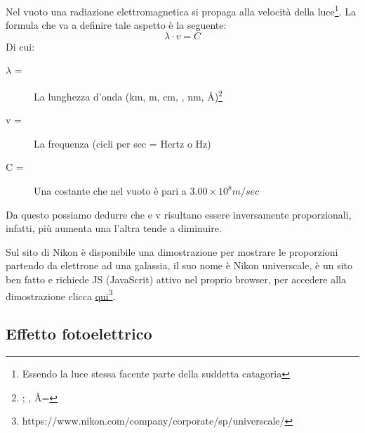 Nel vuoto una radiazione elettromagnetica si propaga alla velocità della luce\footnote{Essendo la luce
  stessa facente parte della suddetta catagoria}. La formula che va a definire tale aspetto è la seguente:
\begin{equation}
  \label{eq:veldiunaradelect}
  \lambda\cdot v=C
\end{equation}
Di cui:
\begin{description}
\item[$\lambda$ =] La lunghezza d'onda (km, m, cm, , nm, Å)\footnote{; , Å=}
\item[v =] La frequenza (cicli per sec = Hertz o Hz)
\item[C =] Una costante che nel vuoto è pari a $3.00\times 10^8 m/sec$
\end{description}
\clearpage
\begin{oss}
  Da questo possiamo dedurre che \ce{\lambda} e v risultano essere inversamente proporzionali, infatti,
  più aumenta una l'altra tende a diminuire.
\end{oss}
\begin{nota}
  Sul sito di Nikon è disponibile una dimostrazione per mostrare le proporzioni partendo da elettrone
  ad una galassia, il suo nome è Nikon universcale, è un sito ben fatto e richiede JS (JavaScrit)
  attivo nel proprio browser, per accedere alla dimostrazione clicca
  \href{https://www.nikon.com/company/corporate/sp/universcale/}{qui}\footnote{https://www.nikon.com/company/corporate/sp/universcale/}.
\end{nota}

\subsection{Effetto fotoelettrico}
\label{sec:effettofotoelettrico}

